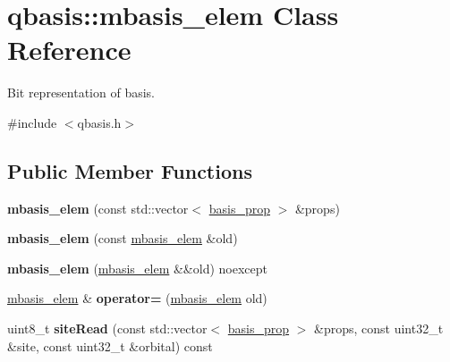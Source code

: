 \hypertarget{classqbasis_1_1mbasis__elem}{}\section{qbasis\+:\+:mbasis\+\_\+elem Class Reference}
\label{classqbasis_1_1mbasis__elem}


Bit representation of basis.  




{\ttfamily \#include $<$qbasis.\+h$>$}

\subsection*{Public Member Functions}
\begin{DoxyCompactItemize}
\item 
\mbox{\label{classqbasis_1_1mbasis__elem_a991d53325bcc6b92d9a2a8014451659c}} 
{\bfseries mbasis\+\_\+elem} (const std\+::vector$<$ \hyperlink{classqbasis_1_1basis__prop}{basis\+\_\+prop} $>$ \&props)
\item 
\mbox{\label{classqbasis_1_1mbasis__elem_a2d1c0a710d81ed2854c22e2e994f7e9c}} 
{\bfseries mbasis\+\_\+elem} (const \hyperlink{classqbasis_1_1mbasis__elem}{mbasis\+\_\+elem} \&old)
\item 
\mbox{\label{classqbasis_1_1mbasis__elem_a31a376fa1d42afd01e885ec5cd7c0a98}} 
{\bfseries mbasis\+\_\+elem} (\hyperlink{classqbasis_1_1mbasis__elem}{mbasis\+\_\+elem} \&\&old) noexcept
\item 
\mbox{\label{classqbasis_1_1mbasis__elem_aa905eebf514184f2e76728f57fa18f16}} 
\hyperlink{classqbasis_1_1mbasis__elem}{mbasis\+\_\+elem} \& {\bfseries operator=} (\hyperlink{classqbasis_1_1mbasis__elem}{mbasis\+\_\+elem} old)
\item 
\mbox{\label{classqbasis_1_1mbasis__elem_aa9f16487364aa9fa0674030d5b0780cf}} 
uint8\+\_\+t {\bfseries site\+Read} (const std\+::vector$<$ \hyperlink{classqbasis_1_1basis__prop}{basis\+\_\+prop} $>$ \&props, const uint32\+\_\+t \&site, const uint32\+\_\+t \&orbital) const
\item 
\mbox{\label{classqbasis_1_1mbasis__elem_a73bbbd244f735d11ced6c6a1bd9f29f2}} 

\end{DoxyCompactItemize}
